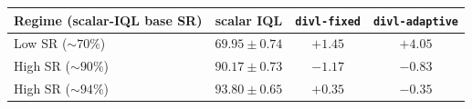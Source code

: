 \begin{tabular}{lccc}
\hline
Regime (scalar-IQL base SR) & scalar IQL & \texttt{divl-fixed} & \texttt{divl-adaptive} \\
\hline
Low SR ($\sim70\%$) & $69.95 \pm 0.74$ & $+1.45$ & $+4.05$ \\
High SR ($\sim90\%$) & $90.17 \pm 0.73$ & $-1.17$ & $-0.83$ \\
High SR ($\sim94\%$) & $93.80 \pm 0.65$ & $+0.35$ & $-0.35$ \\
\hline
\end{tabular}
